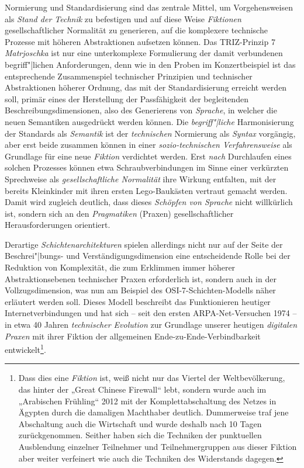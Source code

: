\documentclass[12pt,a4paper]{article}
\begin{document}
Normierung und Standardisierung sind das zentrale Mittel, um Vorgehensweisen
als \emph{Stand der Technik} zu befestigen und auf diese Weise
\emph{Fiktionen} gesellschaftlicher Normalität zu generieren, auf die
komplexere technische Prozesse mit höheren Abstraktionen aufsetzen können. Das
TRIZ-Prinzip 7 \emph{Matrjoschka} ist nur eine unterkomplexe Formulierung der
damit verbundenen begriff"|lichen Anforderungen, denn wie in den Proben im
Konzertbeispiel ist das entsprechende Zusammenspiel technischer Prinzipien und
technischer Abstraktionen höherer Ordnung, das mit der Standardisierung
erreicht werden soll, primär eines der Herstellung der Passfähigkeit der
begleitenden Beschreibungsdimensionen, also des Generierens von
\emph{Sprache}, in welcher die neuen Semantiken ausgedrückt werden können. Die
\emph{begriff"|liche} Harmonisierung der Standards als \emph{Semantik} ist der
\emph{technischen} Normierung als \emph{Syntax} vorgängig, aber erst beide
zusammen können in einer \emph{sozio-technischen Verfahrensweise} als
Grundlage für eine neue \emph{Fiktion} verdichtet werden. Erst \emph{nach}
Durchlaufen eines solchen Prozesses können etwa Schraubverbindungen im Sinne
einer verkürzten Sprechweise als \emph{gesellschaftliche Normalität} ihre
Wirkung entfalten, mit der bereits Kleinkinder mit ihren ersten Lego-Baukästen
vertraut gemacht werden.  Damit wird zugleich deutlich, dass dieses
\emph{Schöpfen von Sprache} nicht willkürlich ist, sondern sich an den
\emph{Pragmatiken} (Praxen) gesellschaftlicher Herausforderungen orientiert.

Derartige \emph{Schichtenarchitekturen} spielen allerdings nicht nur auf der
Seite der Beschrei"|bungs- und Verständigungsdimension eine entscheidende
Rolle bei der Reduktion von Komplexität, die zum Erklimmen immer höherer
Abstraktionsebenen technischer Praxen erforderlich ist, sondern auch in der
Vollzugsdimension, was nun am Beispiel des OSI-7-Schichten-Modells näher
erläutert werden soll. Dieses Modell beschreibt das Funktionieren heutiger
Internetverbindungen und hat sich -- seit den ersten ARPA-Net-Versuchen 1974
-- in etwa 40 Jahren \emph{technischer Evolution} zur Grundlage unserer
heutigen \emph{digitalen Praxen} mit ihrer Fiktion der allgemeinen
Ende-zu-Ende-Verbindbarkeit entwickelt\footnote{Dass dies eine \emph{Fiktion}
  ist, weiß nicht nur das Viertel der Weltbevölkerung, das hinter der „Great
  Chinese Firewall“ lebt, sondern wurde auch im „Arabischen Frühling“ 2012 mit
  der Komplettabschaltung des Netzes in Ägypten durch die damaligen Machthaber
  deutlich. Dummerweise traf jene Abschaltung auch die Wirtschaft und wurde
  deshalb nach 10 Tagen zurückgenommen. Seither haben sich die Techniken der
  punktuellen Ausblendung einzelner Teilnehmer und Teilnehmergruppen aus
  dieser Fiktion aber weiter verfeinert wie auch die Techniken des Widerstands
  dagegen.}.
\end{document}

